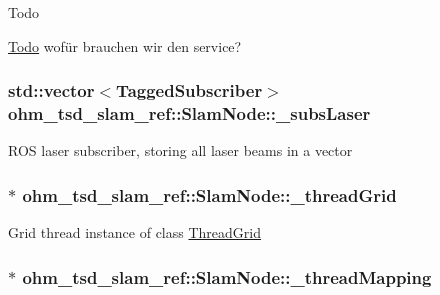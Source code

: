 \begin{DoxyRefDesc}{Todo}
\item[\hyperlink{todo__todo000015}{Todo}]wofür brauchen wir den service? \end{DoxyRefDesc}
\hypertarget{classohm__tsd__slam__ref_1_1SlamNode_a65b1147fbe5c773c55a7e2b640b77d01}{
\subsubsection[{\-\_\-subs\-Laser}]{\setlength{\rightskip}{0pt plus 5cm}std\-::vector$<${\bf Tagged\-Subscriber}$>$ ohm\-\_\-tsd\-\_\-slam\-\_\-ref\-::\-Slam\-Node\-::\-\_\-subs\-Laser\hspace{0.3cm}{\ttfamily [private]}}}\label{classohm__tsd__slam__ref_1_1SlamNode_a65b1147fbe5c773c55a7e2b640b77d01}
R\-O\-S laser subscriber, storing all laser beams in a vector \hypertarget{classohm__tsd__slam__ref_1_1SlamNode_aa8894ed7f5c7413c1cfe5da64e3ac5b5}{
\subsubsection[{\-\_\-thread\-Grid}]{$\ast$ ohm\-\_\-tsd\-\_\-slam\-\_\-ref\-::\-Slam\-Node\-::\-\_\-thread\-Grid\hspace{0.3cm}{\ttfamily [private]}}}\label{classohm__tsd__slam__ref_1_1SlamNode_aa8894ed7f5c7413c1cfe5da64e3ac5b5}
Grid thread instance of class \hyperlink{classohm__tsd__slam__ref_1_1ThreadGrid}{Thread\-Grid} \hypertarget{classohm__tsd__slam__ref_1_1SlamNode_afdc6f1e42ee4910090dd49e84aa3cd82}{
\subsubsection[{\-\_\-thread\-Mapping}]{$\ast$ ohm\-\_\-tsd\-\_\-slam\-\_\-ref\-::\-Slam\-Node\-::\-\_\-thread\-Mapping\hspace{0.3cm}{\ttfamily [private]}}}\label{classohm__tsd__slam__ref_1_1SlamNode_afdc6f1e42ee4910090dd49e84aa3cd82}
